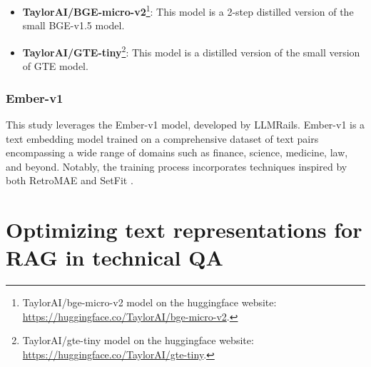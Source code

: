 \begin{itemize}
  \item \textbf{TaylorAI/BGE-micro-v2}\footnote{TaylorAI/bge-micro-v2 model on the huggingface website: \url{https://huggingface.co/TaylorAI/bge-micro-v2}.}:
    This model is a 2-step distilled \cite{sanh2020distilbert} version of the small \ac{BGE}-v1.5 model.
  \item \textbf{TaylorAI/GTE-tiny}\footnote{TaylorAI/gte-tiny model on the huggingface website: \url{https://huggingface.co/TaylorAI/gte-tiny}.}:
    This model is a distilled \cite{sanh2020distilbert} version of the small version of \ac{GTE} model.
\end{itemize}

\subsubsection{Ember-v1}
This study leverages the Ember-v1 model, developed by LLMRails.
Ember-v1 is a text embedding model trained on a comprehensive dataset of text pairs encompassing a wide range of domains such as finance, science, medicine, law, and beyond.
Notably, the training process incorporates techniques inspired by both \ac{RetroMAE} \cite{xiao2022retromae} and SetFit \cite{tunstall2022efficient}. 





\section{Optimizing text representations for \ac{RAG} in technical \ac{QA}}

